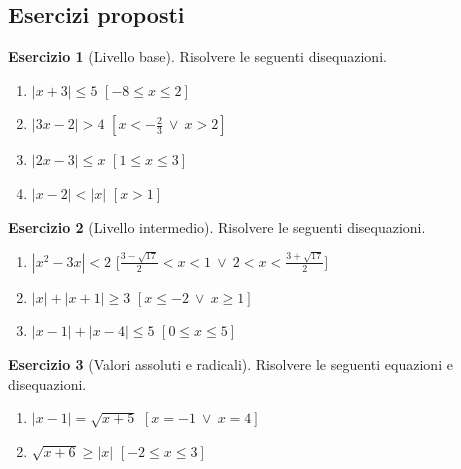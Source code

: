 \documentclass[12pt,a4paper,openany]{book}
\theoremstyle{definition}
\newtheorem{esercizio}{Esercizio}[section]
\theoremstyle{plain}
\theoremstyle{remark}
\newcommand{\abs}[1]{\left|#1\right|}
\begin{document}
\subsection*{Esercizi proposti}

\begin{esercizio}[Livello base]
Risolvere le seguenti disequazioni.
\begin{enumerate}[label=\alph*)]
\item $\abs{x+3}\le 5$ \hfill $[-8\le x\le 2]$
\item $\abs{3x-2}>4$ \hfill $[x<-\tfrac23\ \lor\ x>2]$
\item $\abs{2x-3}\le x$ \hfill $[1\le x\le 3]$
\item $\abs{x-2}<\abs{x}$ \hfill $[x>1]$
\end{enumerate}
\end{esercizio}

\begin{esercizio}[Livello intermedio]
Risolvere le seguenti disequazioni.
\begin{enumerate}[label=\alph*)]
\item $\abs{x^2-3x}<2$ \hfill $\bigl[\tfrac{3-\sqrt{17}}{2}<x<1\ \lor\ 2<x<\tfrac{3+\sqrt{17}}{2}\bigr]$
\item $\abs{x}+\abs{x+1}\ge 3$ \hfill $[x\le -2\ \lor\ x\ge 1]$
\item $\abs{x-1}+\abs{x-4}\le 5$ \hfill $[0\le x\le 5]$
\end{enumerate}
\end{esercizio}

\begin{esercizio}[Valori assoluti e radicali]
Risolvere le seguenti equazioni e disequazioni.
\begin{enumerate}[label=\alph*)]
\item $\abs{x-1}=\sqrt{x+5}$ \hfill $[x=-1\ \lor\ x=4]$
\item $\sqrt{x+6}\ge\abs{x}$ \hfill $[-2\le x\le 3]$
\end{enumerate}
\end{esercizio}
\end{document}
